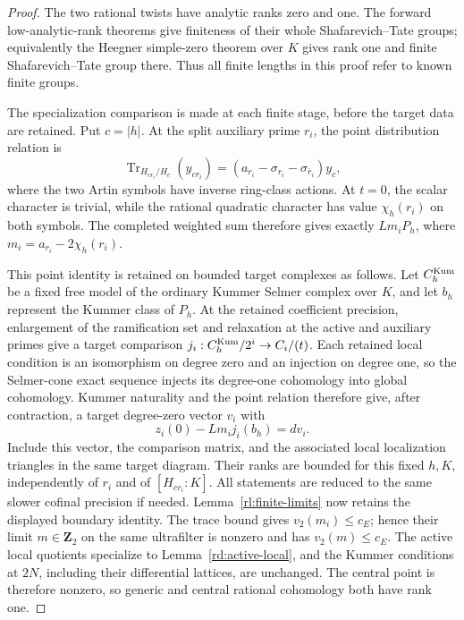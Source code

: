 \begin{proof}
The two rational twists have analytic ranks zero and one.
The forward low-analytic-rank theorems give finiteness of
their whole Shafarevich--Tate groups; equivalently the
Heegner simple-zero theorem over \(K\) gives rank one
and finite Shafarevich--Tate group there.  Thus all finite
lengths in this proof refer to known finite groups.

The specialization comparison is made at each finite stage, before
the target data are retained.  Put \(c=|h|\).  At the split auxiliary
prime \(r_i\), the point distribution relation is
\[
 \operatorname{Tr}_{H_{cr_i}/H_c}(y_{cr_i})
       =(a_{r_i}-\sigma_{r_i}-\sigma_{\bar r_i})y_c,
\]
where the two Artin symbols have inverse ring-class actions.  At
\(t=0\), the scalar character is trivial, while the rational quadratic
character has value \(\chi_h(r_i)\) on both symbols.  The completed
weighted sum therefore gives exactly
\(L m_i P_h\), where \(m_i=a_{r_i}-2\chi_h(r_i)\).

This point identity is retained on bounded target complexes as follows.
Let \(C_h^{\rm Kum}\) be a fixed free model of the ordinary Kummer Selmer complex
over \(K\), and let \(b_h\) represent the Kummer class of \(P_h\).
At the retained coefficient precision, enlargement of the ramification
set and relaxation at the active and auxiliary primes give a target
comparison \(j_i:C_h^{\rm Kum}/2^i\to C_i/(t)\).  Each retained local
condition is an isomorphism on degree zero and an injection on degree
one, so the Selmer-cone exact sequence injects its degree-one
cohomology into global cohomology.  Kummer naturality and the point
relation therefore give, after contraction, a target degree-zero vector
\(v_i\) with
\[
 z_i(0)-L m_i j_i(b_h)=d v_i.
\]
Include this vector, the comparison matrix, and the associated local
localization triangles in the same target diagram.  Their ranks are
bounded for this fixed \(h,K\), independently of \(r_i\) and of
\([H_{cr_i}:K]\).  All statements are reduced to the same slower
cofinal precision if needed.  Lemma~\ref{rl:finite-limits} now retains
the displayed boundary identity.  The trace bound gives
\(v_2(m_i)\le c_E\); hence their limit \(m\in\mathbf Z_2\) on the
same ultrafilter is nonzero and has \(v_2(m)\le c_E\).
The active local quotients specialize
to Lemma~\ref{rd:active-local}, and the Kummer conditions at
\(2N\), including their differential lattices, are unchanged.
The central point is therefore nonzero, so generic
and central rational cohomology both have rank one.


\end{proof}
